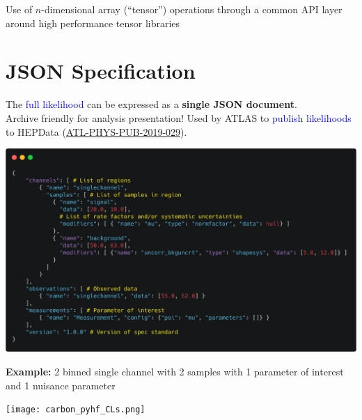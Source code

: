 \documentclass[princeton,portrait]{a0poster}
\begin{document}
\begin{multicols}{2}
 \noindent Use of $n$-dimensional array (``tensor'') operations through a common API layer around high performance tensor libraries


 \section*{\LARGE\color{MediumBlue} JSON Specification}
 The \textcolor{blue}{full likelihood} can be expressed as a \textbf{single JSON document}.\\Archive friendly for analysis presentation! Used by ATLAS to \textcolor{blue}{publish likelihoods} to HEPData (\textcolor{blue}{\href{https://atlas.web.cern.ch/Atlas/GROUPS/PHYSICS/PUBNOTES/ATL-PHYS-PUB-2019-029/}{ATL-PHYS-PUB-2019-029}}).
 \vspace{0.5em}
 \begin{center}
  \href{https://raw.githubusercontent.com/scikit-hep/pyhf/master/docs/examples/json/2-bin_1-channel.json}{\includegraphics[width=0.6\linewidth]{carbon_JSON_spec_annotated.png}}
 \end{center}
 \vspace{-1em}
 \begin{center}
  {\small\textbf{Example:} 2 binned single channel with 2 samples with 1 parameter of interest and 1 nuisance parameter}
 \end{center}
 \begin{center}
  \texttt{[image: carbon\_pyhf\_CLs.png]}
 \end{center}
\end{multicols}
\end{document}
